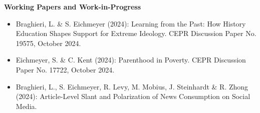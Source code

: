 \documentclass[letterpaper,11pt]{article}
\begin{document}
\begin{normalsize}
\bigskip

\textbf{Working Papers and Work-in-Progress} 
\begin{itemize}[leftmargin=*]
\itemsep0em 
\item Braghieri, L. \& S. Eichmeyer (2024): Learning from the Past: How History Education Shapes Support for Extreme Ideology. CEPR Discussion Paper No. 19575, October 2024.
\item Eichmeyer, S. \& C. Kent (2024): Parenthood in Poverty. CEPR Discussion Paper No. 17722, October 2024.
\item Braghieri, L., S. Eichmeyer, R. Levy, M. Mobius, J. Steinhardt \& R. Zhong (2024):  Article-Level Slant and Polarization of News Consumption on Social Media.
\end{itemize}

\bigskip

{ %

}
\end{normalsize}
\end{document}
